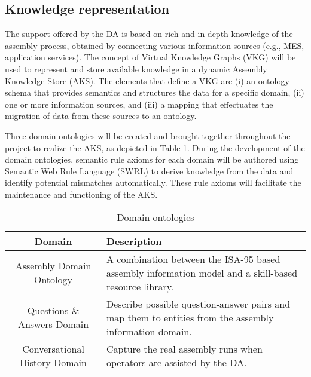 \subsection{Knowledge representation}

The support offered by the DA is based on rich and in-depth knowledge of the assembly process, obtained by connecting various information sources (e.g., MES, application services). The concept of Virtual Knowledge Graphs (VKG) \cite{xiao2019VirtualKnowledgeGraphs} will be used to represent and store available knowledge in a dynamic Assembly Knowledge Store (AKS). The elements that define a VKG are (i) an ontology schema that provides semantics and structures the data for a specific domain, (ii) one or more information sources, and (iii) a mapping that effectuates the migration of data from these sources to an ontology. 

Three domain ontologies will be created and brought together throughout the project to realize the AKS, as depicted in Table \ref{tab:ontolgoies}. During the development of the domain ontologies, semantic rule axioms \cite{sormaz2019SIMPMUpperlevelOntology} for each domain will be authored using Semantic Web Rule Language (SWRL) to derive knowledge from the data and identify potential mismatches automatically. These rule axioms will facilitate the maintenance and functioning of the AKS.

\begin{table}
  \caption{Domain ontologies}
  \label{tab:ontolgoies}
  \begin{tabular}{cp{7cm}}
    \toprule
    Domain & Description\\
    \midrule
    Assembly Domain Ontology &  A combination between the ISA-95 based assembly information model \cite{claeys2018OntologicalModelManaging} and a skill-based resource library.\\ 
    Questions \& Answers Domain & Describe possible question-answer pairs and map them to entities from the assembly information domain. \\
    Conversational History Domain & Capture the real assembly runs when operators are assisted by the DA.\\
    \bottomrule
  \end{tabular}
\end{table}


